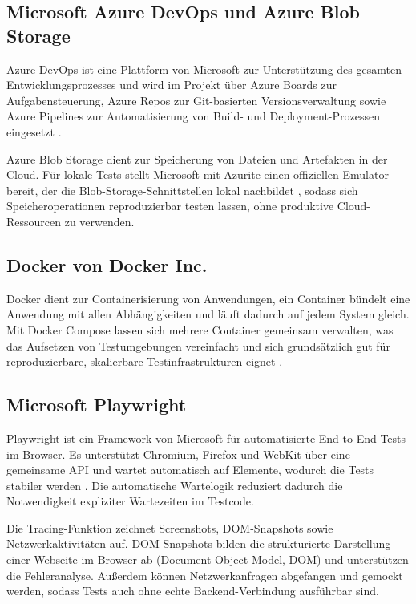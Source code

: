 \subsection{Microsoft Azure DevOps und Azure Blob Storage}
Azure DevOps ist eine Plattform von Microsoft zur Unterstützung des gesamten Entwicklungsprozesses \cite{MicrosoftAzureDevOpsWhatIs2026} und wird im Projekt über Azure Boards zur Aufgabensteuerung, Azure Repos zur Git-basierten Versionsverwaltung sowie Azure Pipelines zur Automatisierung von Build- und Deployment-Prozessen eingesetzt \cite{MicrosoftAzureBoardsPlanTrack2026,MicrosoftAzurePipelines2026}.

Azure Blob Storage dient zur Speicherung von Dateien und Artefakten in der Cloud. Für lokale Tests stellt Microsoft mit Azurite einen offiziellen Emulator bereit, der die Blob-Storage-Schnittstellen lokal nachbildet \cite{MicrosoftAzurite2026}, sodass sich Speicheroperationen reproduzierbar testen lassen, ohne produktive Cloud-Ressourcen zu verwenden.

\subsection{Docker von Docker Inc.}
Docker dient zur Containerisierung von Anwendungen, ein Container bündelt eine Anwendung mit allen Abhängigkeiten und läuft dadurch auf jedem System gleich. Mit Docker Compose lassen sich mehrere Container gemeinsam verwalten, was das Aufsetzen von Testumgebungen vereinfacht \cite{DockerDocs2026,DockerComposeSpec2020} und sich grundsätzlich gut für reproduzierbare, skalierbare Testinfrastrukturen eignet \cite{Lemos2026}.

\subsection{Microsoft Playwright}
Playwright ist ein Framework von Microsoft für automatisierte End-to-End-Tests im Browser. Es unterstützt Chromium, Firefox und WebKit über eine gemeinsame \ac{API} und wartet automatisch auf Elemente, wodurch die Tests stabiler werden \cite{PlaywrightDocs2026}. Die automatische Wartelogik reduziert dadurch die Notwendigkeit expliziter Wartezeiten im Testcode.

Die Tracing-Funktion zeichnet Screenshots, DOM-Snapshots sowie Netzwerkaktivitäten auf. DOM-Snapshots bilden die strukturierte Darstellung einer Webseite im Browser ab (Document Object Model, DOM) und unterstützen die Fehleranalyse. Außerdem können Netzwerkanfragen abgefangen und gemockt werden, sodass Tests auch ohne echte Backend-Verbindung ausführbar sind.

